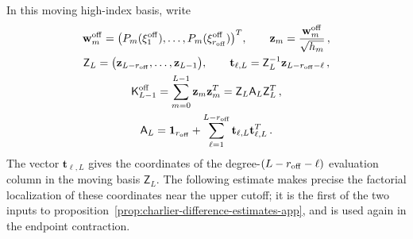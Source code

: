 \documentclass[a4paper,11pt]{article}
\theoremstyle{definition}
\theoremstyle{remark}
\newcommand{\Id}{\mathbf 1}
\begin{document}
In this moving high-index basis, write 
\begin{equation}
\begin{gathered}
   \mathbf w_m^{\rm off}
   =
   \bigl(P_m(\xi_1^{\rm off}),\ldots,
   P_m(\xi_{r_{\rm off}}^{\rm off})\bigr)^T,
   \qquad
   \mathbf z_m=\frac{\mathbf w_m^{\rm off}}{\sqrt{h_m}}\,,\\
   \mathsf Z_L
   =
   \bigl(\mathbf z_{L-r_{\rm off}},\ldots,\mathbf z_{L-1}\bigr),
   \qquad
   \mathbf t_{\ell,L}
   =\mathsf Z_L^{-1}\mathbf z_{L-r_{\rm off}-\ell}\,,\\
   \mathsf K_{L-1}^{\rm off}
   =\sum_{m=0}^{L-1}\mathbf z_m\mathbf z_m^T
   =\mathsf Z_L\mathsf A_L\mathsf Z_L^T\,,\\
   \mathsf A_L
   =\Id_{r_{\rm off}}
   +\sum_{\ell=1}^{L-r_{\rm off}}
   \mathbf t_{\ell,L}\mathbf t_{\ell,L}^T\,.
\end{gathered}
   \label{eq:H1-normalized-packed-Gram-app}
\end{equation}
The vector \(\mathbf t_{\ell,L}\) gives the coordinates of the
degree-\((L-r_{\rm off}-\ell)\) evaluation column in the moving
basis \(\mathsf Z_L\). The following estimate makes precise the factorial localization of these coordinates near the upper cutoff; it is the first of the two inputs to proposition~\ref{prop:charlier-difference-estimates-app}, and is used again in the endpoint contraction.
\end{document}

